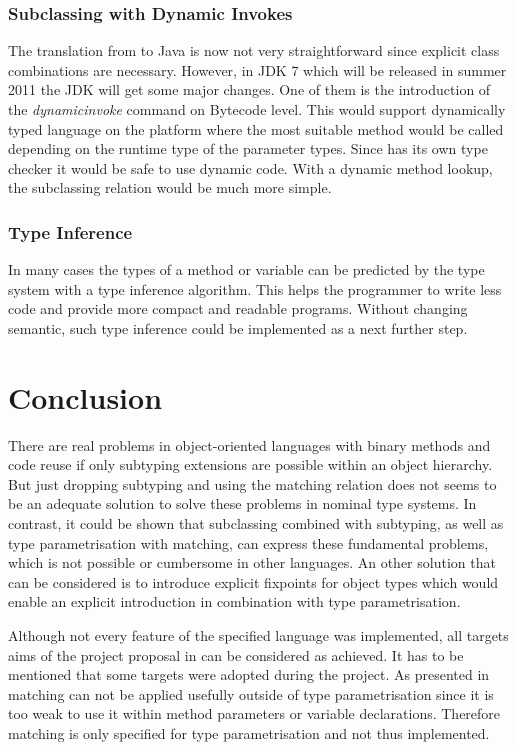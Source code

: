 \subsubsection{Subclassing with Dynamic Invokes}
The translation from \ooplss to Java is now not very straightforward since
explicit class combinations are necessary. However, in JDK 7 which will
be released in summer 2011 the JDK will get some major changes. One
of them is the introduction of the \emph{dynamicinvoke} command on
Bytecode level. This would support dynamically typed language on the
platform where the most suitable method would be called depending on the
runtime type of the parameter types. Since \ooplss has its own type
checker it would be safe to use dynamic code. With a dynamic method
lookup, the subclassing relation would be much more simple.

\subsubsection{Type Inference}
In many cases the types of a method or variable can be predicted
by the type system with a type inference algorithm. This helps
the programmer to write less code and provide more compact and readable
programs. Without changing \ooplsss semantic, such type inference
could be implemented as a next further step.

\section{Conclusion}
\label{ctr:conclusion}
There are real problems in object-oriented languages with binary methods
and code reuse if only subtyping extensions are possible within an object
hierarchy. But just dropping subtyping and using the matching relation
does not seems to be an adequate solution to solve these problems in
nominal type systems. In contrast, it could be shown that subclassing
combined with subtyping, as well as type parametrisation with matching,
can express these fundamental problems, which is not possible or
cumbersome in other languages. An other solution that can be considered
is to introduce explicit fixpoints for object types which would enable
an explicit \mytype introduction in combination with type parametrisation.

Although not every feature of the specified language was implemented,
all targets aims of the project proposal in 
can be considered as achieved. It has to be mentioned that some targets
were adopted during the project. As presented in 
matching can not be applied usefully outside of type parametrisation
since it is too weak to use it within method parameters or variable
declarations.  Therefore matching is only specified for type
parametrisation and not thus implemented.
